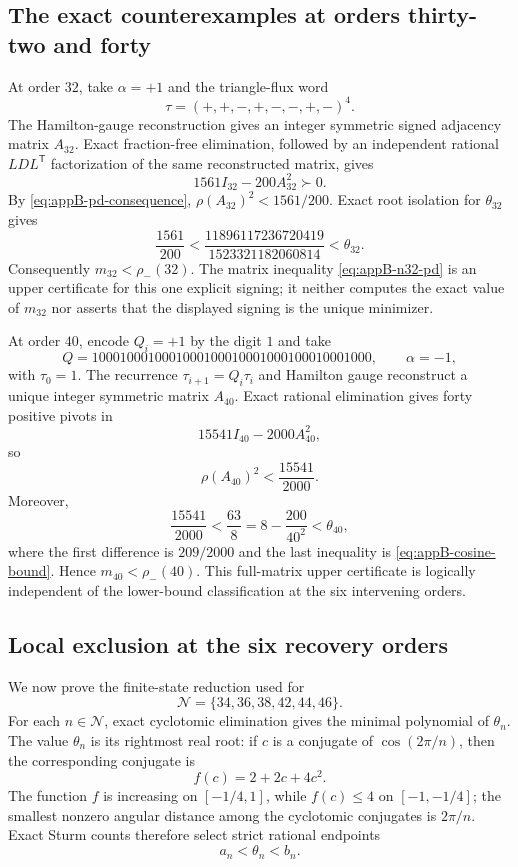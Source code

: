 \subsection{The exact counterexamples at orders thirty-two and forty}
\label{app:orders-32-40}

At order \(32\), take \(\alpha=+1\) and the triangle-flux word
\[
 \tau=(+,+,-,+,-,-,+,-)^4.
\]
The Hamilton-gauge reconstruction gives an integer symmetric signed
adjacency matrix \(A_{32}\).  Exact fraction-free elimination, followed by
an independent rational \(LDL^{\mathsf T}\) factorization of the same
reconstructed matrix, gives
\begin{equation}\label{eq:appB-n32-pd}
 1561I_{32}-200A_{32}^2\succ0.
\end{equation}
By \eqref{eq:appB-pd-consequence},
\(\rho(A_{32})^2<1561/200\).  Exact root isolation for \(\theta_{32}\)
gives
\[
 \frac{1561}{200}
 <\frac{11896117236720419}{1523321182060814}
 <\theta_{32}.
\]
Consequently \(m_{32}<\rho_-(32)\).  The matrix inequality
\eqref{eq:appB-n32-pd} is an upper certificate for this one explicit
signing; it neither computes the exact value of \(m_{32}\) nor asserts that
the displayed signing is the unique minimizer.

At order \(40\), encode \(Q_i=+1\) by the digit \(1\) and take
\[
 Q=1000100010001000100010001000100010001000,
 \qquad \alpha=-1,
\]
with \(\tau_0=1\).  The recurrence \(\tau_{i+1}=Q_i\tau_i\) and Hamilton
gauge reconstruct a unique integer symmetric matrix \(A_{40}\).  Exact
rational elimination gives forty positive pivots in
\begin{equation}\label{eq:appB-n40-pd}
 15541I_{40}-2000A_{40}^2,
\end{equation}
so
\[
 \rho(A_{40})^2<\frac{15541}{2000}.
\]
Moreover,
\[
 \frac{15541}{2000}<\frac{63}{8}
 =8-\frac{200}{40^2}<\theta_{40},
\]
where the first difference is \(209/2000\) and the last inequality is
\eqref{eq:appB-cosine-bound}.  Hence \(m_{40}<\rho_-(40)\).  This
full-matrix upper certificate is logically independent of the lower-bound
classification at the six intervening orders.

\subsection{Local exclusion at the six recovery orders}
\label{app:local-exclusion}

We now prove the finite-state reduction used for
\[
 \mathcal N=\{34,36,38,42,44,46\}.
\]
For each \(n\in\mathcal N\), exact cyclotomic elimination gives the minimal
polynomial of \(\theta_n\).  The value \(\theta_n\) is its rightmost real
root: if \(c\) is a conjugate of \(\cos(2\pi/n)\), then the corresponding
conjugate is
\[
 f(c)=2+2c+4c^2.
\]
The function \(f\) is increasing on \([-1/4,1]\), while \(f(c)\leq4\) on
\([-1,-1/4]\); the smallest nonzero angular distance among the cyclotomic
conjugates is \(2\pi/n\).  Exact Sturm counts therefore select strict
rational endpoints
\begin{equation}\label{eq:appB-isolating-interval}
 a_n<\theta_n<b_n.
\end{equation}

